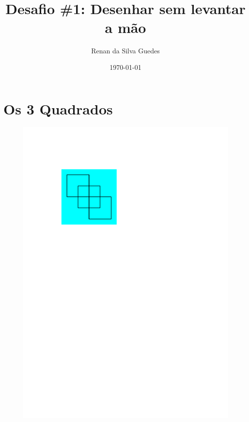 \documentclass[12pt, a4paper]{article}
\title{Desafio \#1: Desenhar sem levantar a mão}
\author{Renan da Silva Guedes}
\date{\today}
\begin{document}
	\maketitle
	\vspace{5cm}
	\tableofcontents
	
	\newpage
	\section{Os 3 Quadrados}
	\begin{figure}[H]
		\centering
		\includegraphics[width=0.25\linewidth]{3squares/3squares}
		\label{fig:3squares}
	\end{figure}
\end{document}
